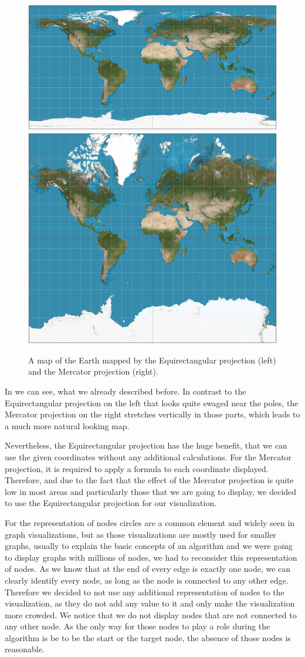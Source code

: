 \documentclass
[
    paper = a4,
    pagesize,
    12 pt,
    oneside,                       %
    open = right,
    DIV = calc,
    BCOR = 0 mm,                   %
    bibtotoc
]
{scrbook}
\begin{document}
\begin{figure}
  \begin{minipage}{\textwidth}
    \includegraphics[width=.5\textwidth]{Images/Equirectangular_projection_SW.jpg}
    \includegraphics[width=.5\textwidth]{Images/Mercator_projection_SW.jpg}
    \caption[]{A map of the Earth mapped by the Equirectangular projection (left) and the Mercator projection (right). }
    \label{fig:projections}
  \end{minipage}
\end{figure}

In  we can see, what we already described before.
In contrast to the Equirectangular projection on the left that looks quite swaged near the poles, the Mercator projection on the right stretches vertically in those parts, which leads to a much more natural looking map.

Nevertheless, the Equirectangular projection has the huge benefit, that we can use the given coordinates without any additional calculations.
For the Mercator projection, it is required to apply a formula to each coordinate displayed.
Therefore, and due to the fact that the effect of the Mercator projection is quite low in most areas and particularly those that we are going to display, we decided to use the Equirectangular projection for our visualization.

For the representation of nodes circles are a common element and widely seen in graph visualizations, but as those visualizations are mostly used for smaller graphs, usually to explain the basic concepts of an algorithm and we were going to display graphs with millions of nodes, we had to reconsider this representation of nodes.
As we know that at the end of every edge is exactly one node, we can clearly identify every node, as long as the node is connected to any other edge.
Therefore we decided to not use any additional representation of nodes to the visualization, as they do not add any value to it and only make the visualization more crowded.
We notice that we do not display nodes that are not connected to any other node.
As the only way for those nodes to play a role during the algorithm is be to be the start or the target node, the absence of those nodes is reasonable.
\end{document}
